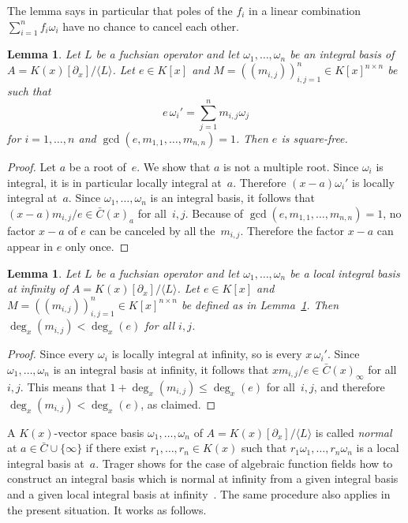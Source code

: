 \documentclass{sig-alternate}
\newtheorem{lemma}[theorem]{Lemma}
\def\<#1>{\langle#1\rangle}
\begin{document}
The lemma says in particular that poles of the $f_i$ in a linear combination
$\sum_{i=1}^n f_i\omega_i$ have no chance to cancel each other.

\begin{lemma}\label{lemma:e}
  Let $L$ be a fuchsian operator and let
  $\omega_1,\dots,\omega_n$ be an integral basis of $A=K(x)[\partial_x]/\<L>$.
  Let $e\in K[x]$ and
  $M=((m_{i,j}))_{i,j=1}^n\in K[x]^{n\times n}$ be such that
  \[
    e\,\omega_i'=\sum_{j=1}^n m_{i,j}\omega_j
  \]
  for $i=1,\dots,n$ and $\gcd(e,m_{1,1},\dots,m_{n,n})=1$.
  Then $e$ is square-free.
\end{lemma}
\begin{proof}
  Let $a$ be a root of~$e$. We show that $a$ is not a multiple root.
  Since $\omega_i$ is integral, it is in particular locally integral at~$a$.
  Therefore $(x-a)\omega_i'$ is locally integral at~$a$.
  Since $\omega_1,\dots,\omega_n$ is an integral basis, it follows that
  $(x-a)m_{i,j}/e\in\bar C(x)_a$ for all~$i,j$.
  Because of $\gcd(e,m_{1,1},\dots,m_{n,n})=1$, no factor $x-a$ of $e$
  can be canceled by all the~$m_{i,j}$.
  Therefore the factor $x-a$ can appear in $e$ only once.
\end{proof}

\begin{lemma} \label{lemma:degM}
  Let $L$ be a fuchsian operator and let $\omega_1,\dots,\omega_n$ be a local integral
  basis at infinity of $A=K(x)[\partial_x]/\<L>$. Let $e\in K[x]$ and $M=((m_{i,j}))_{i,j=1}^n\in K[x]^{n\times n}$
  be defined as in Lemma~\ref{lemma:e}. Then $\deg_x(m_{i,j})<\deg_x(e)$ for all $i,j$.
\end{lemma}
\begin{proof}
  Since every $\omega_i$ is locally integral at infinity, so is every $x\,\omega_i'$.
  Since $\omega_1,\dots,\omega_n$ is an integral basis at infinity, it follows that
  $xm_{i,j}/e\in\bar C(x)_\infty$ for all~$i,j$. This means that $1+\deg_x(m_{i,j})\leq\deg_x(e)$
  for all~$i,j$, and therefore $\deg_x(m_{i,j})<\deg_x(e)$, as claimed.
\end{proof}

A $K(x)$-vector space basis $\omega_1,\dots,\omega_n$ of $A=K(x)[\partial_x]/\<L>$ is
called \emph{normal} at $a\in\bar C\cup\{\infty\}$ if there exist $r_1,\dots,r_n\in
K(x)$ such that $r_1\omega_1,\dots,r_n\omega_n$ is a local integral basis
at~$a$. Trager shows for the case of algebraic function fields how to construct
an integral basis which is normal at infinity from a given integral basis and
a given local integral basis at infinity~\cite{trager84}. The same procedure also applies
in the present situation. It works as follows.
\end{document}
